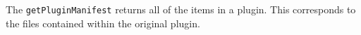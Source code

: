 The \verb+getPluginManifest+ returns all of the items in a plugin. This corresponds to the
files contained within the original plugin.
